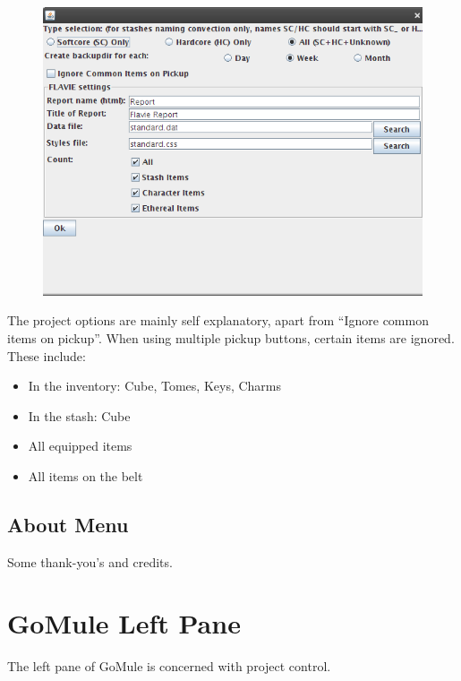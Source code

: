 \documentclass[a4paper,10pt]{article}
\begin{document}
\begin{figure}[htp]
\centering
 \includegraphics[width=140mm]{projOpts.png}
\end{figure}

The project options are mainly self explanatory, apart from ``Ignore common items on pickup''. When using multiple pickup buttons, certain items are ignored. These include:

\begin{itemize}
 \item In the inventory: Cube, Tomes, Keys, Charms
 \item In the stash: Cube
 \item All equipped items
 \item All items on the belt
\end{itemize}

\subsection{About Menu}

Some thank-you's and credits.

\section{GoMule Left Pane}

The left pane of GoMule is concerned with project control.
\end{document}

